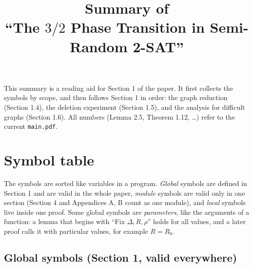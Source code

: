 ﻿\documentclass[10pt,a4paper]{article}
\title{\bfseries Summary of\\ ``The \(3/2\) Phase Transition in Semi-Random 2-SAT''}
\date{}
\begin{document}
\maketitle
\vspace{-2.5em}

\noindent This summary is a reading aid for Section 1 of the paper. It first
collects the symbols by scope, and then follows Section 1 in order: the graph
reduction (Section 1.4), the deletion experiment (Section 1.5), and the
analysis for difficult graphs (Section 1.6). All numbers (Lemma 2.5,
Theorem 1.12, \dots) refer to the current \texttt{main.pdf}.

\section{Symbol table}\label{sec:symbols}

The symbols are sorted like variables in a program. \emph{Global} symbols are
defined in Section 1 and are valid in the whole paper, \emph{module} symbols are
valid only in one section (Section 4 and Appendices A, B count as one module),
and \emph{local} symbols live inside one proof. Some global symbols are
\emph{parameters}, like the arguments of a function: a lemma that begins with
``Fix \(\Delta,R,\rho\)'' holds for all values, and a later proof calls it with
particular values, for example \(R=R_0\).

\subsection{Global symbols (Section 1, valid everywhere)}
\end{document}
